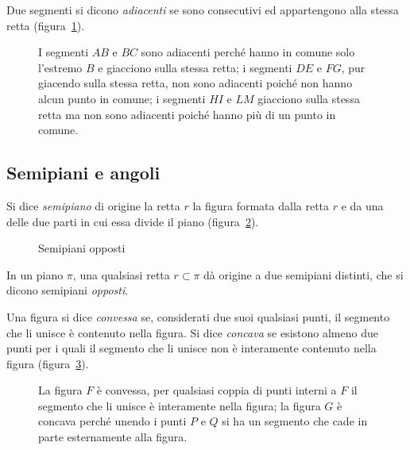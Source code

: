 \begin{definizione}
Due segmenti si dicono \emph{adiacenti} se sono consecutivi ed appartengono alla stessa retta (figura~\ref{fig:1.15}).
\end{definizione}
\begin{figure}[tbh]
 \centering 
 \caption{I segmenti $AB$ e $BC$ sono adiacenti perché hanno in comune solo l'estremo $B$ e giacciono sulla stessa retta; i segmenti $DE$ e $FG$, pur giacendo sulla stessa retta, non sono adiacenti poiché non hanno alcun punto in comune; i segmenti $HI$ e $LM$ giacciono sulla stessa retta ma non sono adiacenti poiché hanno più di un punto in comune.}\label{fig:1.15}
\end{figure}

\ovalbox{\risolvii \ref{ese:1.43}, \ref{ese:1.44}, \ref{ese:1.45}, \ref{ese:1.46}, \ref{ese:1.47}, \ref{ese:1.48}, \ref{ese:1.49}, \ref{ese:1.50}}

\subsection{Semipiani e angoli}

\begin{definizione}
Si dice \emph{semipiano} di origine la retta $r$ la figura formata dalla retta $r$ e da una delle due parti in cui essa divide il piano (figura~\ref{fig:1.17}).
\end{definizione}
\begin{figure}[b,t,h]
 \centering
  \caption{Semipiani opposti}\label{fig:1.17}
\end{figure}
In un piano ${\pi}$, una qualsiasi retta $r \subset \pi$ dà origine a due semipiani distinti, che si dicono semipiani \emph{opposti}.

\begin{definizione}
Una figura si dice \emph{convessa} se, considerati due suoi qualsiasi punti, il segmento che li unisce è contenuto nella figura. Si dice \emph{concava} se esistono almeno due punti per i quali il segmento che li unisce non è interamente contenuto nella figura (figura~\ref{fig:1.18}).
\end{definizione}
\begin{figure}[b,t,h]
 \centering 
 \caption{La figura $ F $ è convessa, per qualsiasi coppia di punti interni a $ F $ il segmento che li unisce è interamente nella figura; la figura $ G $ è concava perché unendo i punti $ P $ e $ Q $ si ha un segmento che cade in parte esternamente alla figura.}\label{fig:1.18}
\end{figure}

